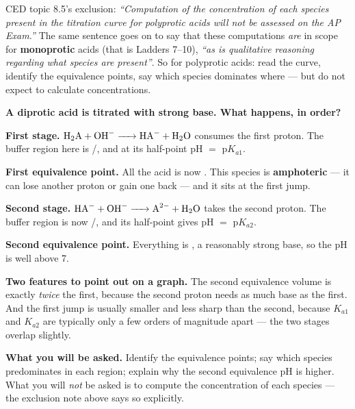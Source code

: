 \documentclass{apchem-worksheet}
\begin{document}
\begin{apcnote}
CED topic 8.5's exclusion: \emph{``Computation of the concentration of
each species present in the titration curve for polyprotic acids will
not be assessed on the AP Exam.''} The same sentence goes on to say
that these computations \emph{are} in scope for \textbf{monoprotic}
acids (that is Ladders 7--10), \emph{``as is qualitative reasoning
regarding what species are present''}. So for polyprotic acids: read
the curve, identify the equivalence points, say which species dominates
where --- but do not expect to calculate concentrations.
\end{apcnote}

\begin{workedexample}
\textbf{A diprotic acid  is titrated with strong base. What
happens, in order?}

\textbf{First stage.} $\ce{H2A + OH- -> HA- + H2O}$ consumes the first
proton. The buffer region here is /, and at its
half-point pH $=$ p$K_{a1}$.

\textbf{First equivalence point.} All the acid is now . This
species is \textbf{amphoteric} --- it can lose another proton or gain
one back --- and it sits at the first jump.

\textbf{Second stage.} $\ce{HA- + OH- -> A^2- + H2O}$ takes the second
proton. The buffer region is now /, and its half-point
gives pH $=$ p$K_{a2}$.

\textbf{Second equivalence point.} Everything is , a
reasonably strong base, so the pH is well above 7.

\textbf{Two features to point out on a graph.} The second equivalence
volume is exactly \emph{twice} the first, because the second proton
needs as much base as the first. And the first jump is usually smaller
and less sharp than the second, because $K_{a1}$ and $K_{a2}$ are
typically only a few orders of magnitude apart --- the two stages
overlap slightly.

\textbf{What you will be asked.} Identify the equivalence points; say
which species predominates in each region; explain why the second
equivalence pH is higher. What you will \emph{not} be asked is to
compute the concentration of each species --- the exclusion note above
says so explicitly.
\end{workedexample}
\end{document}
